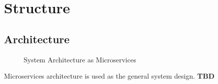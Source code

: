 \section{Structure}
\subsection{Architecture}
\begin{figure}[hb]
    \centering
    \caption{System Architecture as Microservices}
    \label{fig:microservices}
\end{figure}
Microservices architecture is used as the general system design. \textbf{TBD}